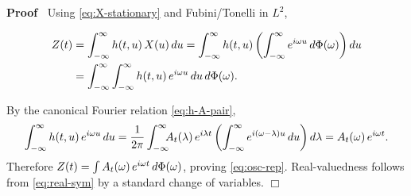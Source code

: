 \documentclass{article}
\newenvironment{proof}{\noindent\textbf{Proof\ }}{\hspace*{\fill}$\Box$\medskip}
\begin{document}
\begin{proof}
  Using \eqref{eq:X-stationary} and Fubini/Tonelli in $L^2$,
  
  \begin{align*}
    Z (t) & = \int_{- \infty}^{\infty} h (t, u)  \hspace{0.17em} X (u) 
    \hspace{0.17em} du = \int_{- \infty}^{\infty} h (t, u) \left( \int_{-
    \infty}^{\infty} e^{i \omega u}  \hspace{0.17em} d \Phi (\omega) \right)
    du\\
    & = \int_{- \infty}^{\infty} \int_{- \infty}^{\infty} h (t, u) 
    \hspace{0.17em} e^{i \omega u}  \hspace{0.17em} du \hspace{0.17em} d \Phi
    (\omega) .
  \end{align*}
  
  By the canonical Fourier relation \eqref{eq:h-A-pair},
  \[ \int_{- \infty}^{\infty} h (t, u)  \hspace{0.17em} e^{i \omega u} 
     \hspace{0.17em} du = \frac{1}{2 \pi}  \int_{- \infty}^{\infty}
     \hspace{-0.17em} \hspace{-0.17em} \hspace{-0.17em} A_t (\lambda) 
     \hspace{0.17em} e^{i \lambda t} \left( \int_{- \infty}^{\infty} e^{i
     (\omega - \lambda) u}  \hspace{0.17em} du \right) d \lambda = A_t
     (\omega)  \hspace{0.17em} e^{i \omega t} . \]
  Therefore $Z (t) = \int A_t (\omega)  \hspace{0.17em} e^{i \omega t} 
  \hspace{0.17em} d \Phi (\omega)$, proving \eqref{eq:osc-rep}.
  Real-valuedness follows from \eqref{eq:real-sym} by a standard change of
  variables.
\end{proof}
\end{document}
